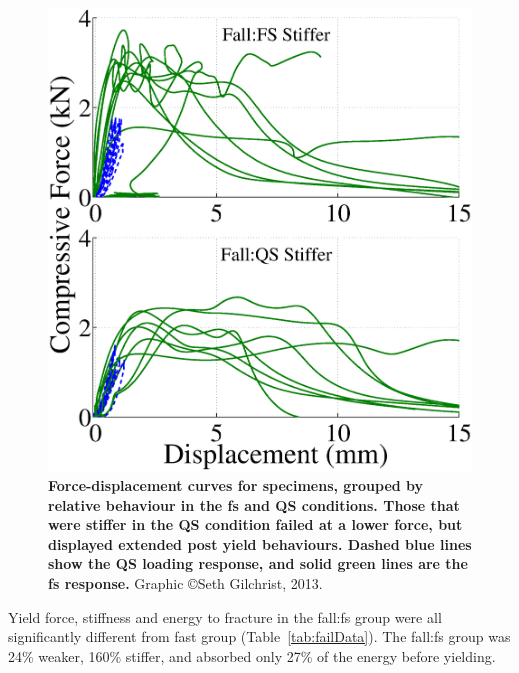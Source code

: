 \begin{figure}
\centering
\includegraphics[width=\linewidth]{./behave_fail/Figures/Force_Disp_GroupedStiff}
\caption[Force-displacement behaviours grouped by relative stiffness of fall:\acs*{fs} and fall:\acs*{QS}]{
\textbf{Force-displacement curves for specimens, grouped by relative behaviour in the \ac{fs} and \ac{QS} conditions. Those that were stiffer in the \ac{QS} condition failed at a lower force, but displayed extended post yield behaviours. Dashed blue lines show the \ac{QS} loading response, and solid green lines are the \ac{fs} response.} Graphic \copyright Seth Gilchrist, 2013.}
\label{fig:Force_Disp_GroupedStiff}
\end{figure}

Yield force, stiffness and energy to fracture in the fall:\ac{fs} group were all significantly different from fast group (Table~\ref{tab:failData}).
The fall:\ac{fs} group was 24\% weaker, 160\% stiffer, and absorbed only 27\% of the energy before yielding.

